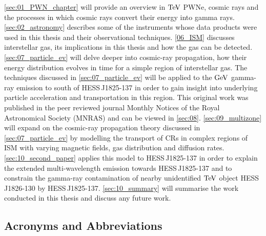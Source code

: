 \autoref{sec:01_PWN_chapter} will provide an overview in $\TeV$ PWNe, cosmic rays and the processes in which cosmic rays convert their energy into gamma rays. \autoref{sec:02_astronomy} describes some of the instruments whose data products were used in this thesis and their observational techniques. \autoref{06_ISM} discusses interstellar gas, its implications in this thesis and how the gas can be detected. \autoref{sec:07_particle_ev} will delve deeper into cosmic-ray propagation, how their energy distribution evolves in time for a simple region of interstellar gas. The techniques discussed in \autoref{sec:07_particle_ev} will be applied to the $\si{\giga\electronvolt}$ gamma-ray emission to south of \mbox{HESS\,J1825-137} in order to gain insight into underlying particle acceleration and transportation in this region. This original work was published in the peer reviewed journal Monthly Notices of the Royal Astronomical Society (MNRAS) and can be viewed in \autoref{sec:08}. \autoref{sec:09_multizone} will expand on the cosmic-ray propagation theory discussed in \autoref{sec:07_particle_ev} by modelling the transport of CRs in complex regions of ISM with varying magnetic fields, gas distribution and diffusion rates. \autoref{sec:10_second_paper} applies this model to \mbox{HESS\,J1825-137} in order to explain the extended multi-wavelength emission towards \mbox{HESS\,J1825-137} and to constrain the gamma-ray contamination of nearby unidentified $\TeV$ object \mbox{HESS\,J1826-130} by \mbox{HESS\,J1825-137}. \autoref{sec:10_summary} will summarise the work conducted in this thesis and discuss any future work.

\subsection*{Acronyms and Abbreviations}

